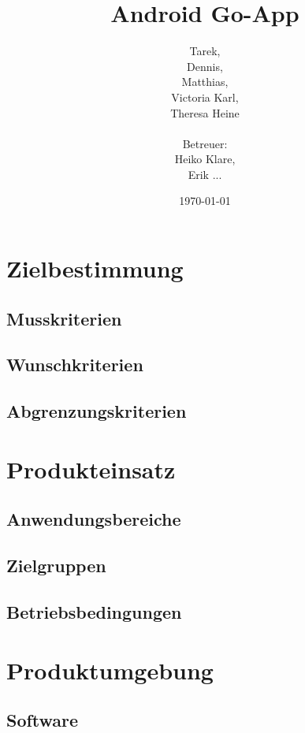\documentclass[parskip=full]{scrartcl}
\begin{document}
\title{Android Go-App}
\author{Tarek, \\Dennis, \\Matthias, \\Victoria Karl, \\Theresa Heine\\
	\\Betreuer: \\Heiko Klare, \\ Erik ...\\}	
\date{\today}
\maketitle
\newpage
\tableofcontents
\newpage


\section{Zielbestimmung}
\subsection{Musskriterien}

\subsection{Wunschkriterien}
\subsection{Abgrenzungskriterien}

\section{Produkteinsatz}
\subsection{Anwendungsbereiche}
\subsection{Zielgruppen}
\subsection{Betriebsbedingungen}

\section{Produktumgebung}
\subsection{Software}
\end{document}
